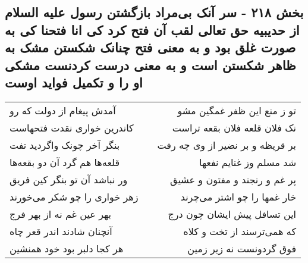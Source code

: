 \begin{center}
\section*{بخش ۲۱۸ - سر آنک بی‌مراد بازگشتن رسول علیه السلام از حدیبیه حق تعالی لقب آن فتح کرد کی انا فتحنا کی به صورت غلق بود و به معنی فتح چنانک شکستن مشک به ظاهر شکستن است و به معنی درست کردنست مشکی او را و تکمیل فواید اوست}
\label{sec:sh218}
\begin{longtable}{l p{0.5cm} r}
آمدش پیغام از دولت که رو
&&
تو ز منع این ظفر غمگین مشو
\\
کاندرین خواری نقدت فتحهاست
&&
نک فلان قلعه فلان بقعه تراست
\\
بنگر آخر چونک واگردید تفت
&&
بر قریظه و بر نضیر از وی چه رفت
\\
قلعه‌ها هم گرد آن دو بقعه‌ها
&&
شد مسلم وز غنایم نفعها
\\
ور نباشد آن تو بنگر کین فریق
&&
پر غم و رنجند و مفتون و عشیق
\\
زهر خواری را چو شکر می‌خورند
&&
خار غمها را چو اشتر می‌چرند
\\
بهر عین غم نه از بهر فرج
&&
این تسافل پیش ایشان چون درج
\\
آنچنان شادند اندر قعر چاه
&&
که همی‌ترسند از تخت و کلاه
\\
هر کجا دلبر بود خود همنشین
&&
فوق گردونست نه زیر زمین
\\
\end{longtable}
\end{center}
